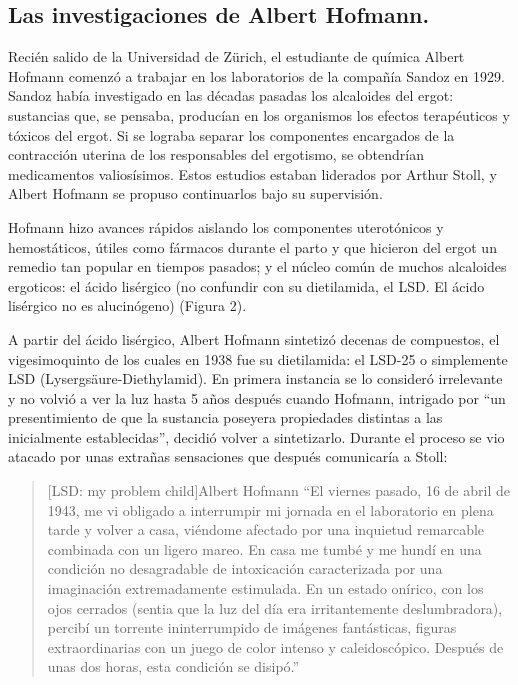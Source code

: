 
\subsection{Las investigaciones de Albert Hofmann.}

Recién salido de la Universidad de Zürich, el estudiante de química Albert Hofmann comenzó a trabajar en los laboratorios de la compañía Sandoz en 1929. Sandoz había investigado en las décadas pasadas los alcaloides del ergot: sustancias que, se pensaba, producían en los organismos los efectos terapéuticos y tóxicos del ergot. Si se lograba separar los componentes encargados de la contracción uterina de los responsables del ergotismo, se obtendrían medicamentos valiosísimos. Estos estudios estaban liderados por Arthur Stoll, y Albert Hofmann se propuso continuarlos bajo su supervisión.

Hofmann hizo avances rápidos aislando los componentes uterotónicos y hemostáticos, útiles como fármacos durante el parto y que hicieron del ergot un remedio tan popular en tiempos pasados; y el núcleo común de muchos alcaloides ergoticos: el ácido lisérgico (no confundir con su dietilamida, el LSD. El ácido lisérgico no es alucinógeno) (Figura 2).


A partir del ácido lisérgico, Albert Hofmann sintetizó decenas de compuestos, el vigesimoquinto de los cuales en 1938 fue su dietilamida: el LSD-25 o simplemente LSD (Lysergsäure-Diethylamid). En primera instancia se lo consideró irrelevante y no volvió a ver la luz hasta 5 años después cuando Hofmann, intrigado por \enquote{un presentimiento de que la sustancia poseyera propiedades distintas a las inicialmente establecidas}, decidió volver a sintetizarlo. Durante el proceso se vio atacado por unas extrañas sensaciones que después comunicaría a Stoll:

\begin{quote}[LSD: my problem child]{Albert Hofmann}
	\enquote{El viernes pasado, 16 de abril de 1943, me vi obligado a interrumpir mi jornada en el laboratorio en plena tarde y volver a casa, viéndome afectado por una inquietud remarcable combinada con un ligero mareo. En casa me tumbé y me hundí en una condición no desagradable de intoxicación caracterizada por una imaginación extremadamente estimulada. En un estado onírico, con los ojos cerrados (sentia que la luz del día era irritantemente deslumbradora), percibí un torrente ininterrumpido de imágenes fantásticas, figuras extraordinarias con un juego de color intenso y caleidoscópico. Después de unas dos horas, esta condición se disipó.}
\end{quote}

